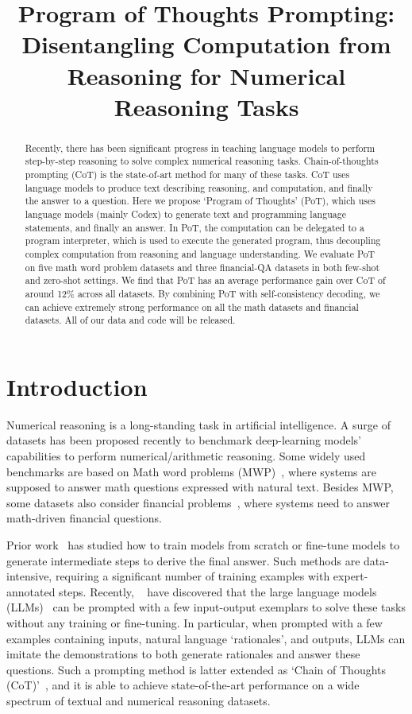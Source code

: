 \title{Program of Thoughts Prompting: Disentangling Computation from Reasoning for Numerical Reasoning Tasks}

\begin{abstract}
Recently, there has been significant progress in teaching language models to perform step-by-step reasoning to solve complex numerical reasoning tasks. Chain-of-thoughts prompting (CoT) is the state-of-art method for many of these tasks. CoT uses language models to produce text describing reasoning, and computation, and finally the answer to a question. Here we propose `Program of Thoughts' (PoT), which uses language models (mainly Codex) to generate text and programming language statements, and finally an answer. In PoT, the computation can be delegated to a program interpreter, which is used to execute the generated program, thus decoupling complex computation from reasoning and language understanding. We evaluate PoT on five math word problem datasets and three financial-QA datasets in both few-shot and zero-shot settings.  We find that PoT has an average performance gain over CoT of around 12\% across all datasets. By combining PoT with self-consistency decoding, we can achieve extremely strong performance on all the math datasets and financial datasets. All of our data and code will be released.
\end{abstract}

\section{Introduction}

Numerical reasoning is a long-standing task in artificial intelligence. A surge of datasets has been proposed recently to benchmark deep-learning models' capabilities to perform numerical/arithmetic reasoning. Some widely used benchmarks are based on Math word problems (MWP)~\citep{cobbe2021training,patel-etal-2021-nlp,lu2022dynamic,ling2017program}, where systems are supposed to answer math questions expressed with natural text. Besides MWP, some datasets also consider financial problems~\citep{chen2021finqa,chen2022convfinqa,zhu2021tat}, where systems need to answer math-driven financial questions.

Prior work~\citep{ling2017program,cobbe2021training} has studied how to train models from scratch or fine-tune models to generate intermediate steps to derive the final answer. Such methods are data-intensive, requiring a significant number of training examples with expert-annotated steps. Recently, ~\cite{nye2021show} have discovered that the large language models (LLMs)~\citep{brown2020language,chen2021evaluating,chowdhery2022palm} can be prompted with a few input-output exemplars to solve these tasks without any training or fine-tuning. In particular, when prompted with a few examples containing inputs, natural language `rationales', and outputs, LLMs can imitate the demonstrations to both generate rationales and answer these questions. Such a prompting method is latter extended as `Chain of Thoughts (CoT)'~\citep{wei2022chain}, and it is able to achieve state-of-the-art performance on a wide spectrum of textual and numerical reasoning datasets. 

